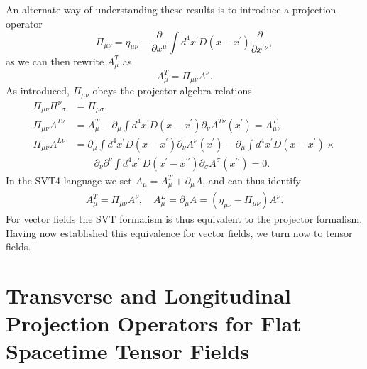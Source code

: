 An alternate way of understanding these results is to introduce a projection operator
%
\begin{equation}
\Pi_{\mu\nu}=\eta_{\mu\nu}-\frac{\partial}{\partial x^{\mu}}\int
d^4x^{\prime}D(x-x^{\prime})\frac{\partial}{\partial x^{\prime \nu}},
\label{A.5a}
\end{equation}
%
as we can then rewrite $A_{\mu}^T$  as 
%
\begin{equation}
A_{\mu}^{T}=\Pi_{\mu\nu}A^{\nu}.
\label{A.6a}
\end{equation}
%
As introduced, $\Pi_{\mu\nu}$ obeys the projector algebra relations
%
\begin{align}
\Pi_{\mu\nu}\Pi^{\nu}_{\phantom{\sigma}\sigma}
&=\Pi_{\mu\sigma},
\nonumber \\
\Pi_{\mu\nu}A^{T \nu}&= A^{T}_{\mu}-\partial_{\mu}\int
d^4x^{\prime}D(x-x^{\prime})
\partial_{\nu}A^{T\nu}(x^{\prime})=A^{T}_{\mu},
\nonumber \\
\Pi_{\mu\nu}A^{L \nu}&=\partial_{\mu}\int
d^4x^{\prime}D(x-x^{\prime})\partial_{\nu}A^{\nu}(x^{\prime})
-\partial_{\mu}\int
d^4x^{\prime}D(x-x^{\prime})\times
\nonumber\\
&\qquad
\partial_{\nu}\partial^{\nu}\int
d^4x^{\prime\prime}D(x^{\prime}-x^{\prime\prime})
\partial_{\sigma}A^{\sigma}(x^{\prime\prime})=0.
\label{A.7a}
\end{align}
%
In the SVT4 language we set  $A_{\mu}=A_{\mu}^T+\partial_{\mu}A$, and can thus identify 
%
\begin{eqnarray}
A_{\mu}^T=  \Pi_{\mu\nu}A^{\nu},\quad A_{\mu}^L=\partial_{\mu}A=(\eta_{\mu\nu}-\Pi_{\mu\nu})A^{\nu}.
\label{A.8a}
\end{eqnarray}
%
For vector fields the SVT formalism is thus equivalent to the projector formalism.  Having now established this equivalence for vector fields, we turn now to tensor fields.

\section{Transverse and Longitudinal Projection Operators for Flat Spacetime Tensor Fields}
\label{aas:tt_long_flat_proj}

